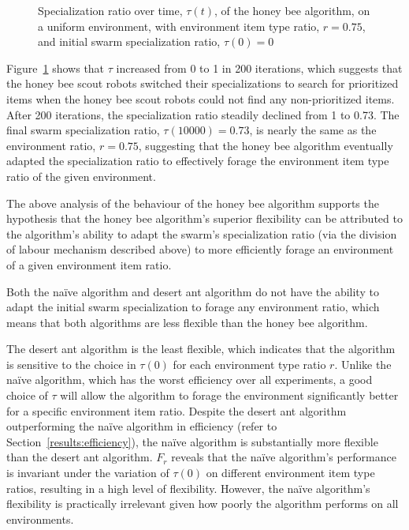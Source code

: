 \documentclass[preprint,12pt]{elsarticle}
\begin{document}
\begin{figure}[htb]
\centering
\resizebox{\textwidth}{!}{}
\caption{Specialization ratio over time, $\tau(t)$, of the honey bee algorithm, on a uniform environment, with environment item type ratio, $r=0.75$, and initial swarm specialization ratio, $\tau(0)=0$}
\label{fig:specializationratioovertime}
\end{figure}

Figure~\ref{fig:specializationratioovertime} shows that $\tau$ increased from 0 to 1 in 200 iterations, which suggests that the honey bee scout robots switched their specializations to search for prioritized items when the honey bee scout robots could not find any non-prioritized items. After 200 iterations, the specialization ratio steadily declined from 1 to 0.73. The final swarm specialization ratio, $\tau(10000)=0.73$, is nearly the same as the environment ratio, $r=0.75$, suggesting that the honey bee algorithm eventually adapted the specialization ratio to effectively forage the environment item type ratio of the given environment.

The above analysis of the behaviour of the honey bee algorithm supports the hypothesis that the honey bee algorithm's superior flexibility can be attributed to the algorithm's ability to adapt the swarm's specialization ratio (via the division of labour mechanism described above) to more efficiently forage an environment of a given environment item ratio.

Both the na\"ive algorithm and desert ant algorithm do not have the ability to adapt the initial swarm specialization to forage any environment ratio, which means that both algorithms are  less flexible than the honey bee algorithm. 

The desert ant algorithm is the least flexible, which indicates that the algorithm is sensitive to the choice in $\tau(0)$ for each environment type ratio $r$. Unlike the na\"ive algorithm, which has the worst efficiency over all experiments, a good choice of $\tau$ will allow the algorithm to forage the environment significantly better for a specific environment item ratio. Despite the desert ant algorithm outperforming the na\"ive algorithm in efficiency (refer to Section~\ref{results:efficiency}), the na\"ive algorithm is substantially more flexible than the desert ant algorithm. $F_r$ reveals that the na\"ive algorithm's performance is invariant under the variation of $\tau(0)$ on different environment item type ratios, resulting in a high level of flexibility. However, the na\"ive algorithm's flexibility is practically irrelevant given how poorly the algorithm performs on all environments. 
\end{document}
